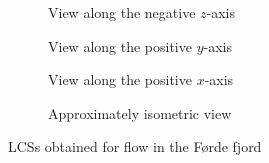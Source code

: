 \begin{figure}[htpb]
    \centering
    \vspace{10.0pt}

    \begin{subfigure}[b]{0.475\textwidth}
        \centering
        \caption[]{{\small View along the negative $z$-axis}}
        \label{fig:u0_dom_err_bs32}
    \end{subfigure}
    \begin{subfigure}[b]{0.475\textwidth}
        \centering
        \caption[]{{\small View along the positive $y$-axis}}
        \label{fig:u0_dom_err_bs54}
    \end{subfigure}

    \begin{subfigure}[b]{0.475\textwidth}
        \centering
        \caption[]{{\small View along the positive $x$-axis}}
        \label{fig:u0_dom_err_dp54}
    \end{subfigure}
    \begin{subfigure}[b]{0.475\textwidth}
        \centering
        \caption[]{{\small Approximately isometric view}}
        \label{fig:u0_dom_err_dp87}
    \end{subfigure}
    \caption[Aviici is love, Aviici is life]{LCSs obtained for flow in the Førde fjord}
    \label{fig:u0_dom_errs}
\end{figure}


